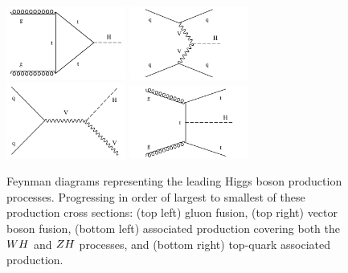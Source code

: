 \begin{figure}[htbp]
\centering
     \includegraphics[width=0.35\textwidth]{phenomology_of_processes/plots/feyn_ggH.pdf}
     \includegraphics[width=0.35\textwidth]{phenomology_of_processes/plots/feyn_qqH.pdf}
     \includegraphics[width=0.35\textwidth]{phenomology_of_processes/plots/feyn_VH.pdf}
     \includegraphics[width=0.35\textwidth]{phenomology_of_processes/plots/feyn_ttH.pdf}
     \caption{
Feynman diagrams representing the leading Higgs boson production processes.
Progressing in order of largest to smallest of these production cross sections:
(top left) gluon fusion, (top right) vector boson fusion, (bottom left)
associated production covering both the $WH$ and $ZH$ processes,
and (bottom right) top-quark associated production.
     }
     \label{fig:higgs_feyn}
\end{figure}


